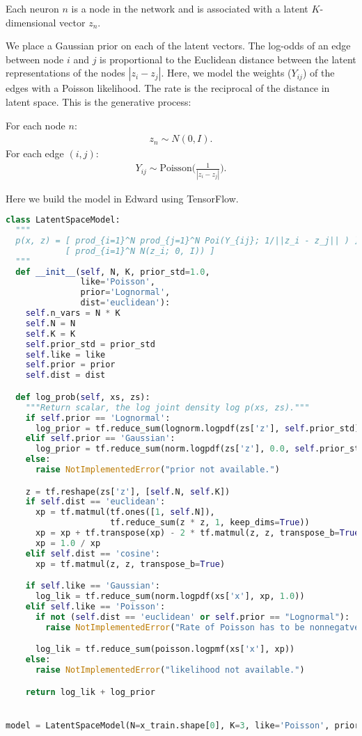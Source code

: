 Each neuron $n$ is a node in the network and is associated with a latent
$K$-dimensional vector $z_n$.

We place a Gaussian prior on each of the latent vectors.
The log-odds of an edge between node $i$ and
$j$ is proportional to the Euclidean distance between the latent
representations of the nodes $|z_i- z_j|$. Here, we
model the weights ($Y_{ij}$) of the edges with a Poisson likelihood.
The rate is the reciprocal of the distance in latent space. This is
the generative process:

For each node $n$:
\begin{align}
z_n \sim N(0,I).
\end{align}
For each edge $(i,j)$:
\begin{align}
Y_{ij} \sim \text{Poisson}\Bigg(\frac{1}{|z_i - z_j|}\Bigg).
\end{align}

Here we build the model in Edward using TensorFlow.
\begin{lstlisting}[language=Python]
class LatentSpaceModel:
  """
  p(x, z) = [ prod_{i=1}^N prod_{j=1}^N Poi(Y_{ij}; 1/||z_i - z_j|| ) ]
            [ prod_{i=1}^N N(z_i; 0, I)) ]
  """
  def __init__(self, N, K, prior_std=1.0,
               like='Poisson',
               prior='Lognormal',
               dist='euclidean'):
    self.n_vars = N * K
    self.N = N
    self.K = K
    self.prior_std = prior_std
    self.like = like
    self.prior = prior
    self.dist = dist

  def log_prob(self, xs, zs):
    """Return scalar, the log joint density log p(xs, zs)."""
    if self.prior == 'Lognormal':
      log_prior = tf.reduce_sum(lognorm.logpdf(zs['z'], self.prior_std))
    elif self.prior == 'Gaussian':
      log_prior = tf.reduce_sum(norm.logpdf(zs['z'], 0.0, self.prior_std))
    else:
      raise NotImplementedError("prior not available.")

    z = tf.reshape(zs['z'], [self.N, self.K])
    if self.dist == 'euclidean':
      xp = tf.matmul(tf.ones([1, self.N]),
                     tf.reduce_sum(z * z, 1, keep_dims=True))
      xp = xp + tf.transpose(xp) - 2 * tf.matmul(z, z, transpose_b=True)
      xp = 1.0 / xp
    elif self.dist == 'cosine':
      xp = tf.matmul(z, z, transpose_b=True)

    if self.like == 'Gaussian':
      log_lik = tf.reduce_sum(norm.logpdf(xs['x'], xp, 1.0))
    elif self.like == 'Poisson':
      if not (self.dist == 'euclidean' or self.prior == "Lognormal"):
        raise NotImplementedError("Rate of Poisson has to be nonnegatve.")

      log_lik = tf.reduce_sum(poisson.logpmf(xs['x'], xp))
    else:
      raise NotImplementedError("likelihood not available.")

    return log_lik + log_prior


model = LatentSpaceModel(N=x_train.shape[0], K=3, like='Poisson', prior='Gaussian')
\end{lstlisting}

